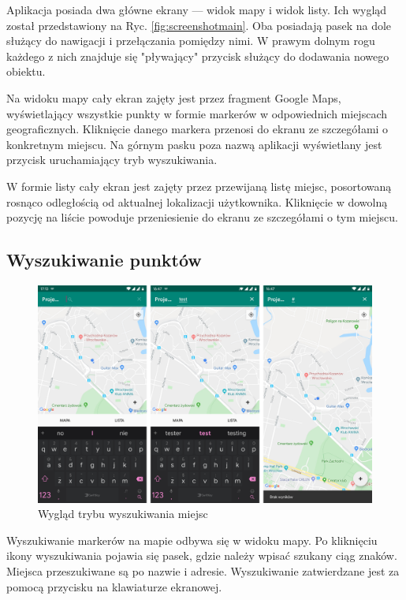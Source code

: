 \documentclass[polish,polish,a4paper,12pt]{article}
\begin{document}
	Aplikacja posiada dwa główne ekrany — widok mapy i widok listy. Ich wygląd został przedstawiony na Ryc. \ref{fig:screenshotmain}. Oba posiadają pasek na dole służący do nawigacji i przełączania pomiędzy nimi. W prawym dolnym rogu każdego z nich znajduje się "pływający" przycisk służący do dodawania nowego obiektu.

	Na widoku mapy cały ekran zajęty jest przez fragment Google Maps, wyświetlający wszystkie punkty w formie markerów w odpowiednich miejscach geograficznych. Kliknięcie danego markera przenosi do ekranu ze szczegółami o konkretnym miejscu. Na górnym pasku poza nazwą aplikacji wyświetlany jest przycisk uruchamiający tryb wyszukiwania.

	W formie listy cały ekran jest zajęty przez przewijaną listę miejsc, posortowaną rosnąco odległością od aktualnej lokalizacji użytkownika. Kliknięcie w dowolną pozycję na liście powoduje przeniesienie do ekranu ze szczegółami o tym miejscu.

	\subsection{Wyszukiwanie punktów}

	\begin{figure}[H]
		\centering
		\includegraphics[width = \textwidth]{screenshot-search}
		\caption{Wygląd trybu wyszukiwania miejsc}
		\label{fig:screenshotsearch}
	\end{figure}

	Wyszukiwanie markerów na mapie odbywa się w widoku mapy. Po kliknięciu ikony wyszukiwania pojawia się pasek, gdzie należy wpisać szukany ciąg znaków. Miejsca przeszukiwane są po nazwie i adresie. Wyszukiwanie zatwierdzane jest za pomocą przycisku na klawiaturze ekranowej.
\end{document}
